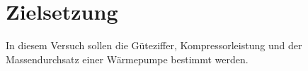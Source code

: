 \section{Zielsetzung}
\label{sec:Ziel}
In diesem Versuch sollen die Güteziffer, Kompressorleistung und der Massendurchsatz
einer Wärmepumpe bestimmt werden.
